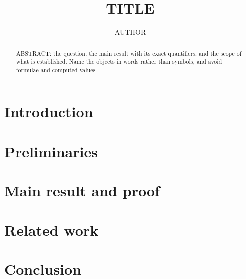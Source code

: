 \documentclass[11pt,reqno]{amsart}
\title{TITLE}
\author{AUTHOR}
\date{}
\theoremstyle{definition}
\theoremstyle{remark}
\begin{document}
\begin{abstract}
ABSTRACT: the question, the main result with its exact quantifiers, and the
scope of what is established. Name the objects in words rather than symbols,
and avoid formulae and computed values.
\end{abstract}

\maketitle

\section{Introduction}

\section{Preliminaries}

\section{Main result and proof}

\section{Related work}

\section{Conclusion}

\appendix


\FloatBarrier
\clearpage

\end{document}
